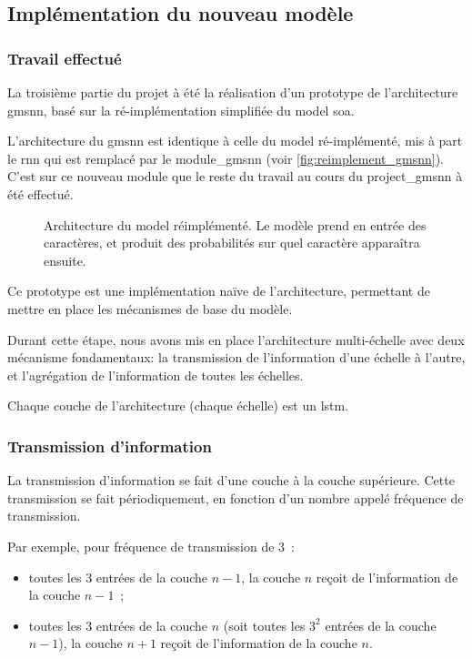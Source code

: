 \newpage
\subsection{Implémentation du nouveau modèle}
\subsubsection{Travail effectué}
La troisième partie du projet à été la réalisation d'un prototype de l'architecture \gls{gmsnn}, basé sur la ré-implémentation simplifiée du \gls{model} \gls{soa}.

L'architecture du \gls{gmsnn} est identique à celle du \gls{model} ré-implémenté, mis à part le \gls{rnn} qui est remplacé par le \gls{module_gmsnn} (voir \autoref{fig:reimplement_gmsnn}). C'est sur ce nouveau module que le reste du travail au cours du \gls{project_gmsnn} à été effectué.

\begin{figure}[ht]
	\centering
	\scalebox{1}{}
	\caption[Architecture du  réimplémenté]{Architecture du \gls{model} réimplémenté. Le modèle prend en entrée des caractères, et produit des probabilités sur quel caractère apparaîtra ensuite.}\label{fig:reimplement_gmsnn}
\end{figure}

Ce prototype est une implémentation naïve de l'architecture, permettant de mettre en place les mécanismes de base du modèle.

Durant cette étape, nous avons mis en place l'architecture multi-échelle avec deux mécanisme fondamentaux: la transmission de l'information d'une échelle à l'autre, et l'agrégation de l'information de toutes les échelles.

Chaque couche de l'architecture (chaque \og échelle\fg{}) est un \gls{lstm}. \label{def:lstm_2}

\subsubsection{Transmission d'information}
La transmission d'information se fait d'une couche à la couche supérieure.
Cette transmission se fait périodiquement, en fonction d'un nombre appelé fréquence de transmission.

Par exemple, pour fréquence de transmission de $3$~: 
\begin{itemize}
	\item toutes les $3$ entrées de la couche $n-1$, la couche $n$ reçoit de l'information de la couche $n-1$~;
	\item toutes les $3$ entrées de la couche $n$ (soit toutes les $3^2$ entrées de la couche $n-1$), la couche $n+1$ reçoit de l'information de la couche $n$.
\end{itemize}

